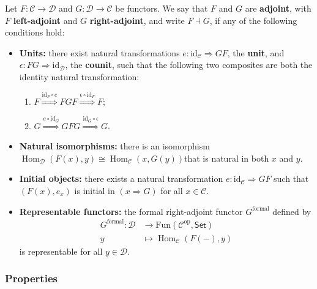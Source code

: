 \documentclass[10pt]{article}
\newcommand{\Set}{\mathsf{Set}}
\newcommand{\id}{\mathrm{id}}
\newcommand{\ccat}{\mathcal{C}}
\newcommand{\dcat}{\mathcal{D}}
\newcommand{\nt}{\Rightarrow}
\newcommand{\Fun}{\mathrm{Fun}}
\newcommand{\op}[1]{{#1}^\text{op}}
\DeclareMathOperator{\Hom}{Hom}
\begin{document}
                Let $F\colon\ccat\to\dcat$ and $G\colon\dcat\to\ccat$ be functors.
                We say that $F$ and $G$ are \textbf{adjoint}, with $F$ \textbf{left-adjoint} and $G$ \textbf{right-adjoint}, and write $F\dashv G$, if any of the following conditions hold:
                \begin{itemize}
                    \item \textbf{Units:} there exist natural transformations $e\colon\id_\ccat\nt GF$, the \textbf{unit}, and $\epsilon\colon FG\nt\id_\dcat$, the \textbf{counit}, such that the following two composites are both the identity natural transformation:
                        \begin{enumerate}
                            \item $F\overset{\id_F\circ e}{\nt}FGF\overset{\epsilon\circ\id_F}{\nt}F$;
                            \item $G\overset{e\circ\id_G}{\nt}GFG\overset{\id_G\circ\epsilon}{\nt}G$.
                        \end{enumerate}
                    \item \textbf{Natural isomorphisms:} there is an isomorphism $\Hom_\dcat(F(x),y)\cong\Hom_\ccat(x,G(y))$that is natural in both $x$ and $y$.
                    \item \textbf{Initial objects:} there exists a natural transformation $e\colon\id_\ccat\nt GF$ such that $(F(x),e_x)$ is initial in $(x\nt G)$ for all $x\in\ccat$.
                    \item \textbf{Representable functors:} the formal right-adjoint functor $G^\text{formal}$ defined by
                        \begin{align*}
                            G^\text{formal}\colon\dcat&\to\Fun(\op{\ccat},\Set)\\
                            y&\mapsto\Hom_\ccat(F(-),y)
                        \end{align*}
                        is representable for all $y\in\dcat$.
                \end{itemize}


            \subsubsection{Properties}
\end{document}
